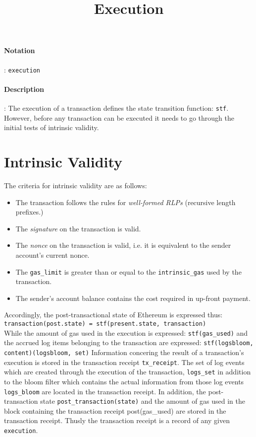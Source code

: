\documentclass[10pt,a4paper,oneside]{scrartcl}
\author{}
\title{Execution}
\date{}
\begin{document}
\maketitle
\paragraph{Notation}: \texttt{execution}
\paragraph{Description}: The execution of a transaction defines the state transition function: \texttt{stf}. However, before any transaction can be executed it needs to go through the initial tests of intrinsic validity. 

\section{Intrinsic Validity}

The criteria for intrinsic validity are as follows:

	\begin{itemize}
		\item The transaction follows the rules for \textsl{well-formed RLPs} (recursive length prefixes.)
		\item The \textsl{signature} on the transaction is valid.
		\item The \textsl{nonce} on the transaction is valid, i.e. it is equivalent to the sender account's current nonce.
		\item The \texttt{gas\_limit} is greater than or equal to the \texttt{intrinsic\_gas} used by the transaction.
		\item The sender's account balance contains the cost required in up-front payment.
	\end{itemize}

Accordingly, the post-transactional state of Ethereum is expressed thus: 
\\


\texttt{transaction(post.state) = stf(present.state, transaction)}  
\\


While the amount of gas used in the execution is expressed: \texttt{stf(gas\_used)} and the accrued log items belonging to the transaction are expressed: \texttt{stf(logsbloom, content)(logsbloom, set)}
Information concering the result of a transaction's execution is stored in the transaction receipt \texttt{tx\_receipt}. The set of log events which are created through the execution of the transaction, \texttt{logs\_set} in addition to the bloom filter which contains the actual information from those log events \texttt{logs\_bloom} are located in the transaction receipt. In addition, the post-transaction state \texttt{post\_transaction(state)} and the amount of gas used in the block containing the transaction receipt post(gas\_used) are stored in the transaction receipt. Thusly the transaction receipt is a record of any given \texttt{execution}. \par
\end{document}
